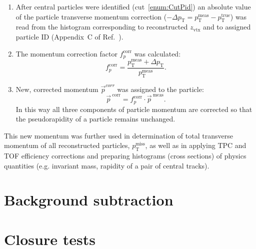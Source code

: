 \begin{enumerate}
	\item After central particles were identified (cut~\ref{enum:CutPid}) an absolute value of the particle transverse momentum correction ($-\Delta p_{\text{T}} = p_{\text{T}}^{\text{meas}}-p_{\text{T}}^{\text{true}}$) was read from the histogram corresponding to reconstructed $z_{\text{vtx}}$ and to assigned particle ID (Appendix~C of Ref.~\cite{supplementaryNote}).
	\item The momentum correction factor $f_{p}^{\text{corr}}$ was calculated:
	\begin{equation}\label{eq:pCorrFactor}
 f_{p}^{\text{corr}} = \frac{p_{\text{T}}^{\text{meas}} + \Delta p_{\text{T}}}{p_{\text{T}}^{\text{meas}}}.
  \end{equation}
  \item New, corrected momentum $\vec{p}^{corr}$ was assigned to the particle:
  \begin{equation}
   \vec{p}^{~\text{corr}} = f_{p}^{\text{corr}} \cdot \vec{p}^{~\text{meas}}.
  \end{equation}
  In this way all three components of particle momentum are corrected so that the pseudorapidity of a particle remains unchanged.
\end{enumerate}
This new momentum was further used in determination of total transverse momentum of all reconstructed particles, $p_{\text{T}}^{\text{miss}}$, as well as in applying TPC and TOF efficiency corrections and preparing histograms (cross sections) of physics quantities (e.g. invariant mass, rapidity of a pair of central tracks).


\section{Background subtraction}\label{sec:bkgdSubtraction}

% 
% 
% 
% 
% 
% 
% 
% 


\section{Closure tests}\label{sec:closureTests}
